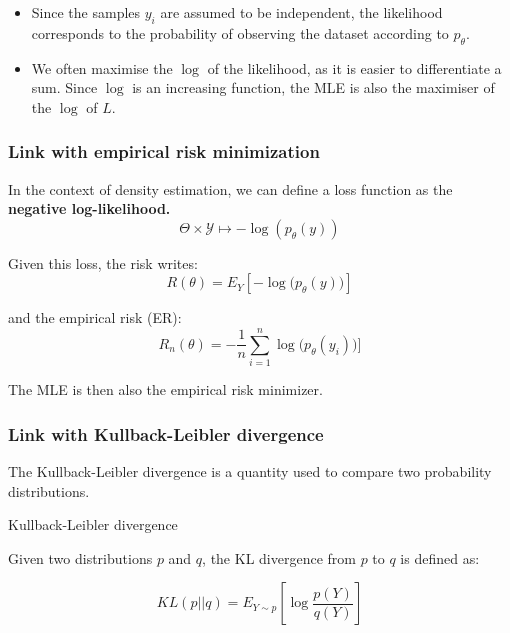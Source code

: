 \documentclass[
10pt, %
a4paper, %
oneside, %
headinclude,footinclude, %
BCOR5mm, %
]{scrartcl}
\begin{document}
\begin{remark}
    \begin{itemize}
        \item Since the samples $y_i$ are assumed to be independent, the likelihood corresponds to the probability of observing the dataset according to $p_{\theta}$.
	\item We often maximise the $\log$ of the likelihood, as it is easier to differentiate a sum. Since $\log$ is an increasing function, the MLE is also the maximiser of the $\log$ of $L$.
    \end{itemize}
\end{remark}

\subsubsection{\large\color{Periwinkle}Link with empirical risk minimization}

In the context of density estimation, we can define a loss function as the \textbf{{negative log-likelihood.}}
\begin{equation*}
    \Theta\times \mathcal{Y} \mapsto - \log(p_{\theta}(y))
\end{equation*}

Given this loss, the risk writes:
\begin{equation*}
    R(\theta) = E_Y[-\log\big(p_{\theta}(y)\big)]
\end{equation*}

and the empirical risk (ER):
\begin{equation*}
    R_n(\theta) =-\frac{1}{n} \sum^{n}_{i=1} \log\big(p_{\theta}(y_i)\big)]
\end{equation*}

The MLE is then also the empirical risk minimizer.

\subsubsection{\large\color{Periwinkle}Link with Kullback-Leibler divergence}

The Kullback-Leibler divergence is a quantity used to compare two probability distributions.

\begin{definition}{Kullback-Leibler divergence}

    Given two distributions $p$ and $q$, the KL divergence from $p$ to $q$ is defined as:

    \begin{equation*}
	KL(p||q) = E_{Y\sim p} [\log \frac{p(Y)}{q(Y)} ]
    \end{equation*}
\end{definition}
\end{document}
